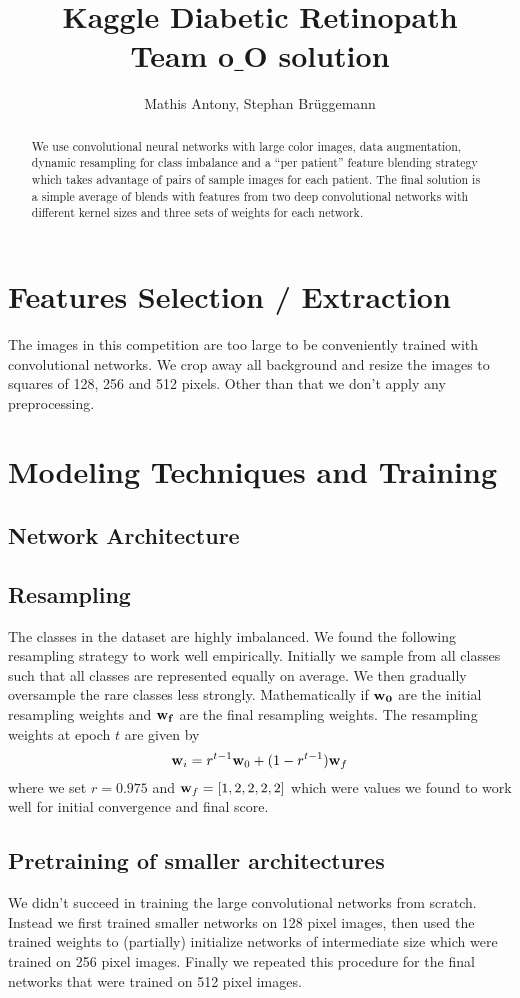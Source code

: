 \documentclass[12pt,a4paper]{scrartcl}
\title{Kaggle Diabetic Retinopath \\ Team o$\_$O solution}
\author{Mathis Antony, Stephan Brüggemann}
\begin{document}
\maketitle

\begin{abstract}
We use convolutional neural networks with large color images, data augmentation, dynamic resampling for class imbalance and a ``per patient'' feature blending strategy which takes advantage of pairs of sample images for each patient. The final solution is a simple average of blends with features from two deep convolutional networks with different kernel sizes and three sets of weights for each network.
\end{abstract}

\section{Features Selection / Extraction}
The images in this competition are too large to be conveniently trained with convolutional networks. We crop away all background and resize the images to squares of 128, 256 and 512 pixels. Other than that we don't apply any preprocessing.
\section{Modeling Techniques and Training}
\subsection{Network Architecture}
\subsection{Resampling}
The classes in the dataset are highly imbalanced. We found the following resampling strategy to work well empirically. Initially we sample from all classes such that all classes are represented equally on average. We then gradually oversample the rare classes less strongly. Mathematically if ${\bf w_0}$ are the initial resampling weights and ${\bf w_f}$ are the final resampling weights. The resampling weights at epoch $t$ are given by
\begin{equation}
{\bf w}_i = r^{t-1} {\bf w}_0 + (1 - r^{t-1}) {\bf w}_f
\end{equation}
where we set $r=0.975$ and ${\bf w}_f = [1, 2, 2, 2, 2]$ which were values we found to work well for initial convergence and final score.
\subsection{Pretraining of smaller architectures}
We didn't succeed in training the large convolutional networks from scratch. Instead we first trained smaller networks on 128 pixel images, then used the trained weights to (partially) initialize networks of intermediate size which were trained on 256 pixel images. Finally we repeated this procedure for the final networks that were trained on 512 pixel images.
\end{document}

